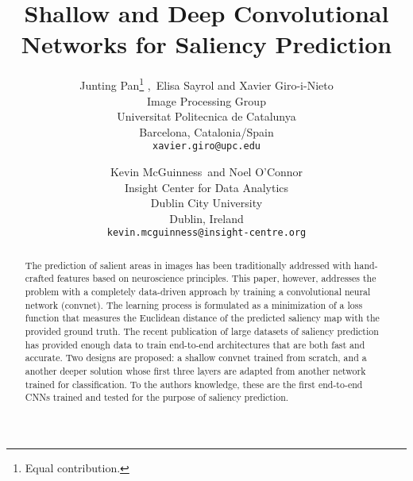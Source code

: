 \documentclass[10pt,twocolumn,letterpaper]{article}
\begin{document}
\title{Shallow and Deep Convolutional Networks for Saliency Prediction}

\author{Junting Pan\thanks{Equal contribution.} ,\ Elisa Sayrol and Xavier Giro-i-Nieto\\
Image Processing Group\\
Universitat Politecnica de Catalunya \\
Barcelona, Catalonia/Spain\\
{\tt\small xavier.giro@upc.edu}
\and
Kevin McGuinness\footnotemark[1] \ and Noel O'Connor\\
Insight Center for Data Analytics\\
Dublin City University\\
Dublin, Ireland\\
{\tt\small kevin.mcguinness@insight-centre.org}
}


\maketitle

\begin{abstract}
The prediction of salient areas in images has been traditionally addressed with hand-crafted features based on neuroscience principles. This paper, however, addresses the problem with a completely data-driven approach by training a convolutional neural network (convnet). The learning process is formulated as a minimization of a loss function that measures the Euclidean distance of the predicted saliency map with the provided ground truth. The recent publication of large datasets of saliency prediction has provided enough data to train end-to-end architectures that are both fast and accurate. Two designs are proposed: a shallow convnet trained from scratch, and a another deeper solution whose first three layers are adapted from another network trained for classification.
To the authors knowledge, these are the first end-to-end CNNs trained and tested for the purpose of saliency prediction.
\end{abstract}
\end{document}
